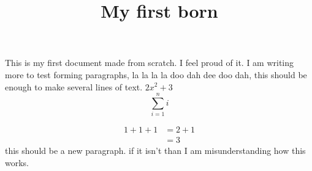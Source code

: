 \documentclass[11pt]{ximera}
\title{My first born}
\begin{document}
This is my first \LaTex document made  from scratch. I feel proud of it. I am writing more to test forming paragraphs, la la la la doo dah dee doo dah, this should be enough to make several lines of text. $2x^2+3$
\[
\sum_{i=1}^n i
\]

\begin{align*}
1+1+1 &= 2+1\\
&=3
\end{align*}
this should be a new paragraph. if it isn't than I am misunderstanding how this works.
\end{document}
